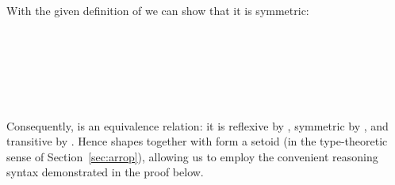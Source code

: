 With the given definition of  we can show that it is symmetric:
\begin{code}%
%
\>[2]\AgdaSpace{}%
\AgdaSymbol{:}\AgdaSpace{}%
\AgdaSpace{}%
\AgdaSpace{}%
\AgdaSpace{}%
\AgdaSpace{}%
\AgdaSpace{}%
\AgdaSpace{}%
\<%
\\
%
\>[2]\AgdaSpace{}%
%
\>[16]\AgdaSymbol{=}\AgdaSpace{}%
\<%
\\
%
\>[2]\AgdaSpace{}%
\AgdaSymbol{(}\AgdaSpace{}%
\AgdaSpace{}%
\AgdaSymbol{)}%
\>[16]\AgdaSymbol{=}\AgdaSpace{}%
\AgdaSpace{}%
\AgdaSpace{}%
\AgdaSpace{}%
\AgdaSpace{}%
\<%
\\
%
\>[2]\AgdaSpace{}%
\AgdaSymbol{(}\AgdaSpace{}%
\AgdaSpace{}%
\AgdaSymbol{)}%
\>[16]\AgdaSymbol{=}\AgdaSpace{}%
\AgdaSpace{}%
\AgdaSpace{}%
\AgdaSpace{}%
\AgdaSpace{}%
\<%
\\
%
\>[2]\AgdaSpace{}%
%
\>[16]\AgdaSymbol{=}\AgdaSpace{}%
\<%
\\
%
\>[2]\AgdaSpace{}%
%
\>[16]\AgdaSymbol{=}\AgdaSpace{}%
\<%
\end{code}
Consequently,  is an equivalence relation: it is reflexive by
, symmetric by , and transitive by . Hence
shapes together with  form a setoid (in the type-theoretic sense
of Section~\ref{sec:arrop}), allowing us to employ the convenient reasoning
syntax demonstrated in the  proof below.

